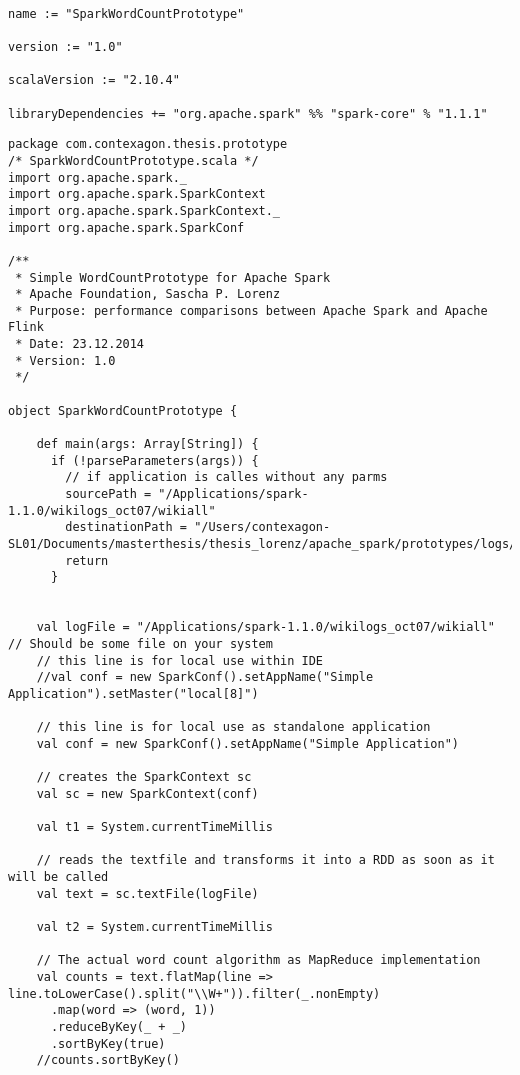 \begin{lstlisting}[label=sbtspark,caption=sbt-Buildfile zum Bauen des Spark-WordCount-Prototyp]

name := "SparkWordCountPrototype"

version := "1.0"

scalaVersion := "2.10.4"

libraryDependencies += "org.apache.spark" %% "spark-core" % "1.1.1"
\end{lstlisting}



\begin{lstlisting}[label=sparkwc,caption=Spark-WordCount-Prototyp mit Implementierung mittels MapReduce-Algorithmus ]
package com.contexagon.thesis.prototype
/* SparkWordCountPrototype.scala */
import org.apache.spark._
import org.apache.spark.SparkContext
import org.apache.spark.SparkContext._
import org.apache.spark.SparkConf

/**
 * Simple WordCountPrototype for Apache Spark
 * Apache Foundation, Sascha P. Lorenz
 * Purpose: performance comparisons between Apache Spark and Apache Flink
 * Date: 23.12.2014
 * Version: 1.0
 */

object SparkWordCountPrototype {

    def main(args: Array[String]) {
      if (!parseParameters(args)) {
        // if application is calles without any parms
        sourcePath = "/Applications/spark-1.1.0/wikilogs_oct07/wikiall"
        destinationPath = "/Users/contexagon-SL01/Documents/masterthesis/thesis_lorenz/apache_spark/prototypes/logs/sparkOutput.out"
        return
      }


    val logFile = "/Applications/spark-1.1.0/wikilogs_oct07/wikiall" // Should be some file on your system
    // this line is for local use within IDE
    //val conf = new SparkConf().setAppName("Simple Application").setMaster("local[8]")

    // this line is for local use as standalone application
    val conf = new SparkConf().setAppName("Simple Application")

    // creates the SparkContext sc
    val sc = new SparkContext(conf)

    val t1 = System.currentTimeMillis

    // reads the textfile and transforms it into a RDD as soon as it will be called
    val text = sc.textFile(logFile)

    val t2 = System.currentTimeMillis

    // The actual word count algorithm as MapReduce implementation
    val counts = text.flatMap(line => line.toLowerCase().split("\\W+")).filter(_.nonEmpty)
      .map(word => (word, 1))
      .reduceByKey(_ + _)
      .sortByKey(true)
    //counts.sortByKey()


\end{lstlisting}
